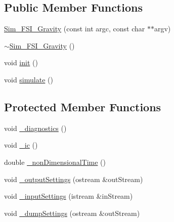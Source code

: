 \subsection*{Public Member Functions}
\begin{DoxyCompactItemize}
\item 
\hyperlink{class_sim___f_s_i___gravity_a66f07ee31fb03d03da96cb53ec48af9d}{Sim\+\_\+\+F\+S\+I\+\_\+\+Gravity} (const int argc, const char $\ast$$\ast$argv)
\item 
\hyperlink{class_sim___f_s_i___gravity_ae64d227ac1845eecae168f8293f78432}{$\sim$\+Sim\+\_\+\+F\+S\+I\+\_\+\+Gravity} ()
\item 
void \hyperlink{class_sim___f_s_i___gravity_a5a3a289351a8c5be69fd233a79d436ef}{init} ()
\item 
void \hyperlink{class_sim___f_s_i___gravity_add86d6f52de51511f0bb93714fc504c4}{simulate} ()
\end{DoxyCompactItemize}
\subsection*{Protected Member Functions}
\begin{DoxyCompactItemize}
\item 
void \hyperlink{class_sim___f_s_i___gravity_a0eb1be561cbc294534d7598b736515f0}{\+\_\+diagnostics} ()
\item 
void \hyperlink{class_sim___f_s_i___gravity_af85ffd4ea8c6745eaecf72093186473e}{\+\_\+ic} ()
\item 
double \hyperlink{class_sim___f_s_i___gravity_a3b3fb225cb6b06da61bfbb848f9be268}{\+\_\+non\+Dimensional\+Time} ()
\item 
void \hyperlink{class_sim___f_s_i___gravity_a2486a6d3cdea039285513b5ff0808dcf}{\+\_\+output\+Settings} (ostream \&out\+Stream)
\item 
void \hyperlink{class_sim___f_s_i___gravity_a5a722386409c6940ce1f33bdfb7543e7}{\+\_\+input\+Settings} (istream \&in\+Stream)
\item 
void \hyperlink{class_sim___f_s_i___gravity_a7aca63857c3b27a9f635eda7cadfd56f}{\+\_\+dump\+Settings} (ostream \&out\+Stream)
\end{DoxyCompactItemize}
